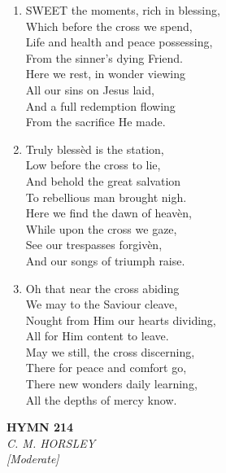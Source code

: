 \documentclass[11pt,a4paper]{article}
\begin{document}
\begin{enumerate}
    \item SWEET the moments, rich in blessing, \\
            Which before the cross we spend, \\
        Life and health and peace possessing, \\
            From the sinner's dying Friend. \\
        Here we rest, in wonder viewing \\
            All our sins on Jesus laid, \\
        And a full redemption flowing \\
            From the sacrifice He made.

    \item Truly bless\`ed is the station, \\
            Low before the cross to lie, \\
        And behold the great salvation \\
            To rebellious man brought nigh. \\
        Here we find the dawn of heav\`en, \\
            While upon the cross we gaze, \\
        See our trespasses forgiv\`en, \\
            And our songs of triumph raise.

    \item Oh that near the cross abiding \\
            We may to the Saviour cleave, \\
        Nought from Him our hearts dividing, \\
            All for Him content to leave. \\
        May we still, the cross discerning, \\
            There for peace and comfort go, \\
        There new wonders daily learning, \\
            All the depths of mercy know.

\end{enumerate}

\newpage
\begin{center}
    {\Large \textbf{HYMN 214}}
    \\
    \textit{C. M. HORSLEY}
    \\
    \textit{\small [Moderate]}
\end{center}
\vspace{1em}
\end{document}
